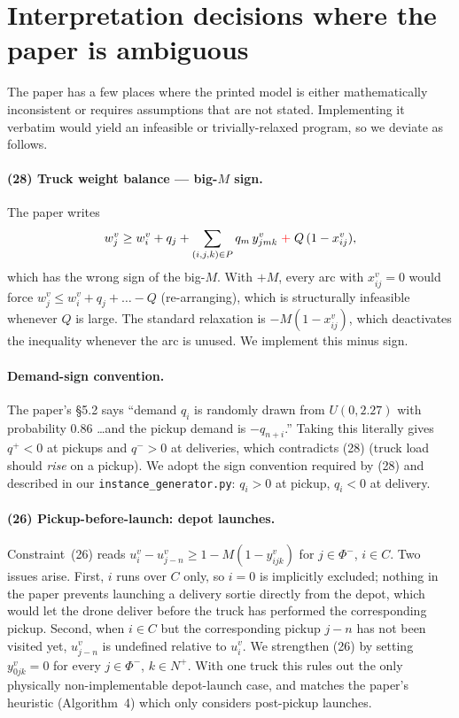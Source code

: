 \documentclass[11pt,a4paper]{article}
\newcommand{\Nplus}{N^{+}}
\begin{document}
\section{Interpretation decisions where the paper is ambiguous}
\label{sec:interpretations}

The paper has a few places where the printed model is either
mathematically inconsistent or requires assumptions that are not stated.
Implementing it verbatim would yield an infeasible or trivially-relaxed
program, so we deviate as follows.

\paragraph{(28) Truck weight balance --- big-$M$ sign.}
The paper writes
\[
w^{v}_{j} \ge w^{v}_{i} + q_{j} + \sum_{(i,j,k)\in P} q_{m}\,y^{v}_{j m k}
\;{\color{red}+}\;Q\,(1 - x^{v}_{ij}),
\]
which has the wrong sign of the big-$M$. With $+M$, every arc with
$x^{v}_{ij}=0$ would force $w^{v}_{j} \le w^{v}_{i} + q_{j} + \dots - Q$
(re-arranging), which is structurally infeasible whenever $Q$ is large.
The standard relaxation is $-M(1-x^{v}_{ij})$, which deactivates the
inequality whenever the arc is unused. We implement this minus sign.

\paragraph{Demand-sign convention.}
The paper's \S5.2 says ``demand $q_i$ is randomly drawn from $U(0, 2.27)$
with probability 0.86 \dots and the pickup demand is $-q_{n+i}$.'' Taking
this literally gives $q^{+} < 0$ at pickups and $q^{-} > 0$ at deliveries,
which contradicts (28) (truck load should \emph{rise} on a pickup). We
adopt the sign convention required by (28) and described in our
\texttt{instance\_generator.py}: $q_i > 0$ at pickup, $q_i < 0$ at delivery.

\paragraph{(26) Pickup-before-launch: depot launches.}
Constraint~(26) reads $u^{v}_{i} - u^{v}_{j-n} \ge 1 - M(1{-}y^{v}_{ijk})$
for $j\in\Phi^{-}$, $i\in C$. Two issues arise. First, $i$ runs over $C$
only, so $i=0$ is implicitly excluded; nothing in the paper prevents
launching a delivery sortie directly from the depot, which would let the
drone deliver before the truck has performed the corresponding pickup.
Second, when $i \in C$ but the corresponding pickup $j-n$ has not been
visited yet, $u^{v}_{j-n}$ is undefined relative to $u^{v}_{i}$. We
strengthen (26) by setting $y^{v}_{0jk}=0$ for every $j\in\Phi^{-}$,
$k\in\Nplus$. With one truck this rules out the only physically
non-implementable depot-launch case, and matches the paper's heuristic
(Algorithm~4) which only considers post-pickup launches.
\end{document}
